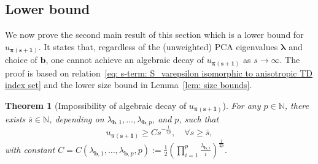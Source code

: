 \documentclass[namedate,webpdf]{ima-authoring-template-blank}
\newcounter{counter}
\numberwithin{counter}{section}
\numberwithin{equation}{section}
\theoremstyle{plain}
\newtheorem{theorem}[counter]{Theorem}
\theoremstyle{definition}
\newcommand*{\bbN}{\mathbb{N}}
\theoremstyle{thmstyletwo}
\begin{document}
\subsection{Lower bound}
\label{subsec: s-term: lower bound}

We now prove the second main result of this section which is a lower bound for \(u_{\bm{\pi(s + 1)}}\). It states that, regardless of the (unweighted) PCA eigenvalues \(\bm{\lambda}\) and choice of \(\bm{b}\), one cannot achieve an algebraic decay of \(u_{\bm{\pi(s + 1)}}\) as \(s \to \infty\). The proof is based on relation~\eqref{eq: s-term: S_varepsilon isomorphic to anisotropic TD index set} and the lower size bound in Lemma~\ref{lem: size bounds}.

\begin{theorem}[Impossibility of algebraic decay of \(u_{\bm{\pi(s + 1)}}\)]
\label{thm: s-term: lower bound for u_pi(s+1)}
    For any \(p \in \bbN\), there exists \(\bar{s} \in \bbN\), depending on \(\lambda_{\bm{b}, 1}, \dots, \lambda_{\bm{b}, p}\), and \(p\), such that
    \[
    u_{\bm{\pi(s+1)}} \geq C s^{-\frac{1}{2p}}, \quad \forall s \geq \bar{s},
    \]
    with constant 
    \(
    C = C(\lambda_{\bm{b},1}, \dots, \lambda_{\bm{b},p}, p) 
    := \frac{1}{2} \left(\prod_{i=1}^p \frac{\lambda_{\bm{b},i}}{i}\right)^{\frac{1}{2p}}.
    \)
\end{theorem}
\end{document}
